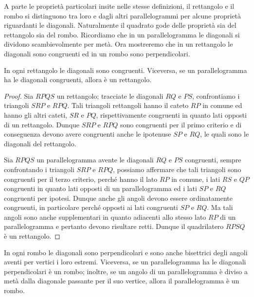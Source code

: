A parte le proprietà particolari insite nelle stesse definizioni, il 
rettangolo e il rombo si distinguono tra loro e dagli altri 
parallelogrammi per alcune proprietà riguardanti le diagonali. 
Naturalmente il quadrato gode delle proprietà sia del rettangolo sia 
del rombo.
Ricordiamo che in un parallelogramma le diagonali si dividono 
scambievolmente per metà. Ora mostreremo che in un rettangolo le 
diagonali sono congruenti ed in un rombo sono perpendicolari.

\begin{teorema}
	In ogni rettangolo le diagonali sono congruenti. Viceversa, se un 
	parallelogramma ha le diagonali congruenti, allora è un rettangolo.
\end{teorema}


\begin{inaccessibleblock}
	\begin{figure}[htb]
		\centering
	\end{figure}
\end{inaccessibleblock}

\begin{proof}
	Sia $RPQS$ un rettangolo; tracciate le diagonali $RQ$ e $PS$, 
	confrontiamo i triangoli $SRP$ e $RPQ$. Tali triangoli rettangoli 
	hanno il cateto $RP$ in comune ed hanno gli altri cateti, $SR$ e 
	$PQ$, rispettivamente congruenti in quanto lati opposti di un 
	rettangolo. Dunque $SRP$ e $RPQ$ sono congruenti per il primo criterio 
	e di conseguenza devono avere congruenti anche le ipotenuse $SP$ e 
	$RQ$, le quali sono le diagonali del rettangolo.
	
	Sia $RPQS$ un parallelogramma avente le diagonali $RQ$ e $PS$ 
	congruenti, sempre confrontando i triangoli $SRP$ e $RPQ$, possiamo 
	affermare che tali triangoli sono congruenti per il terzo criterio, 
	perché hanno il lato $RP$ in comune, i lati $RS$ e $QP$ congruenti in 
	quanto lati opposti di un parallelogramma ed i lati $SP$ e $RQ$ 
	congruenti per ipotesi. Dunque anche gli angoli devono essere 
	ordinatamente congruenti, in particolare  perché opposti ai lati 
	congruenti $SP$ e $RQ$. Ma tali angoli sono anche supplementari in 
	quanto adiacenti allo stesso lato $RP$ di un parallelogramma e 
	pertanto devono risultare retti. Dunque il quadrilatero $RPSQ$ è un 
	rettangolo.
\end{proof}

\begin{teorema}
	In ogni rombo le diagonali sono perpendicolari e sono anche 
	bisettrici degli angoli aventi per vertici i loro estremi. Viceversa, 
	se un parallelogramma ha le diagonali perpendicolari è un rombo; 
	inoltre, se un angolo di un parallelogramma è diviso a metà dalla 
	diagonale passante per il suo vertice, allora il parallelogramma è un 
	rombo.
\end{teorema}


